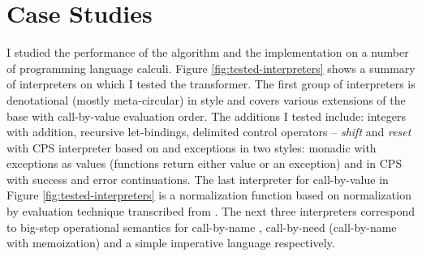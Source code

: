 \chapter{Case Studies}\label{chapter:case-studies}
I studied the performance of the algorithm and the implementation on a number of programming language calculi.
Figure \ref{fig:tested-interpreters} shows a summary of interpreters on which I tested the transformer.
The first group of interpreters is denotational (mostly meta-circular) in style and covers various extensions of the base \LC{} with call-by-value evaluation order.
The additions I tested include: integers with addition, recursive let-bindings, delimited control operators -- \textit{shift} and \textit{reset} with CPS interpreter based on \cite{biernacka-delimited-continuations} and exceptions in two styles: monadic with exceptions as values (functions return either value or an exception) and in CPS with success and error continuations.
The last interpreter for call-by-value in Figure \ref{fig:tested-interpreters} is a normalization function based on normalization by evaluation technique transcribed from \cite{abel-nbe}.
The next three interpreters correspond to big-step operational semantics for call-by-name \LC{}, call-by-need (call-by-name with memoization) and a simple imperative language respectively.

